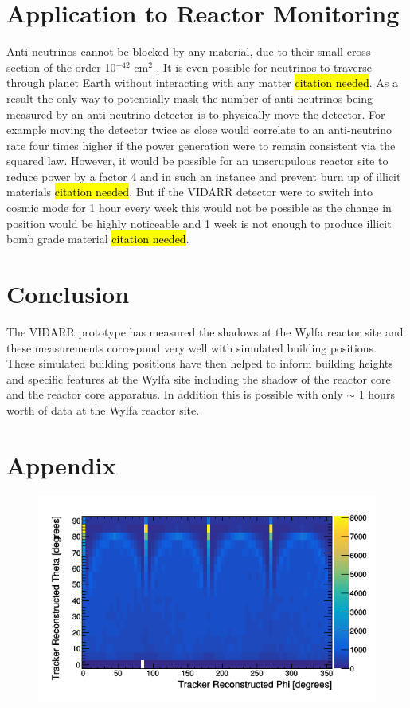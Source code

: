 \documentclass[12pt,a4paper]{article}
\begin{document}
\section{Application to Reactor Monitoring} \label{sec:ApplicationToReactorMonitoring}
Anti-neutrinos cannot be blocked by any material, due to their small cross section of the order 10$^{-42}$ cm$^2$ \cite{Vogel_1999}. It is even possible for neutrinos to traverse through planet Earth without interacting with any matter \hl{citation needed}. As a result the only way to potentially mask the number of anti-neutrinos being measured by an anti-neutrino detector is to physically move the detector. For example moving the detector twice as close would correlate to an anti-neutrino rate four times higher if the power generation were to remain consistent via the squared law. However, it would be possible for an unscrupulous reactor site to reduce power by a factor 4 and in such an instance and prevent burn up of illicit materials \hl{citation needed}. But if the VIDARR detector were to switch into cosmic mode for 1 hour every week this would not be possible as the change in position would be highly noticeable and 1 week is not enough to produce illicit bomb grade material \hl{citation needed}. 

\section{Conclusion} \label{sec:Conclusion}
 The VIDARR prototype has measured the shadows at the Wylfa reactor site and these measurements correspond very well with simulated building positions. These simulated building positions have then helped to inform building heights and specific features at the Wylfa site including the shadow of the reactor core and the reactor core apparatus. In addition this is possible with only $\sim$ 1 hours worth of data at the Wylfa reactor site.

\section{Appendix} \label{sec:appendix}
\begin{figure}[H]
 \centering
 \includegraphics[width=0.7\linewidth]{ReconstructedPhiTheta/pvsTFiduicalHemisphere.png}
 \label{fig:pvstFiducialHem}
\end{figure}
\end{document}
